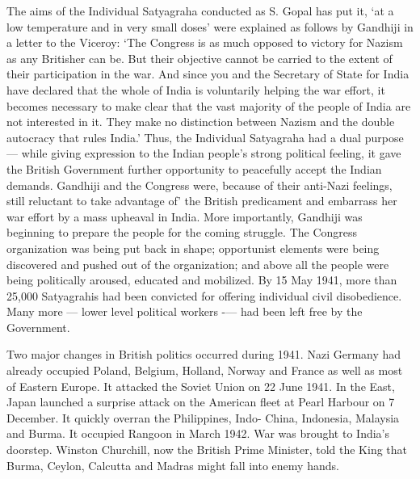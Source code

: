 The aims of the Individual Satyagraha conducted as S. Gopal has put it, ‘at a low temperature and in very small doses’ were explained as follows by Gandhiji in a letter to the Viceroy: ‘The Congress is as much opposed to victory for Nazism as any Britisher can be. But their objective cannot be carried to the extent of their participation in the war. And since you and the Secretary of State for India have declared that the whole of India is voluntarily helping the war effort, it becomes necessary to make clear that the vast majority of the people of India are not interested in it. They make no distinction between Nazism and the double autocracy that rules India.’ Thus, the Individual Satyagraha had a dual purpose — while giving expression to the Indian people’s strong political feeling, it gave the British Government further opportunity to peacefully accept the Indian demands. Gandhiji and the Congress were, because of their anti-Nazi feelings, still reluctant to take advantage of’ the British predicament and embarrass her war effort by a mass upheaval in India. More importantly, Gandhiji was beginning to prepare the people for the coming struggle. The Congress organization was being put back in shape; opportunist elements were being discovered and pushed out of the organization; and above all the people were being politically aroused, educated and mobilized. By 15 May 1941, more than 25,000 Satyagrahis had been convicted for offering individual civil disobedience. Many more — lower level political workers -— had been left free by the Government. 

Two major changes in British politics occurred during 1941. Nazi Germany had already occupied Poland, Belgium, Holland, Norway and France as well as most of Eastern Europe. It attacked the Soviet Union on 22 June 1941. In the East, Japan launched a surprise attack on the American fleet at Pearl Harbour on 7 December. It quickly overran the Philippines, Indo- China, Indonesia, Malaysia and Burma. It occupied Rangoon in March 1942. War was brought to India’s doorstep. Winston Churchill, now the British Prime Minister, told the King that Burma, Ceylon, Calcutta and Madras might fall into enemy hands. 

